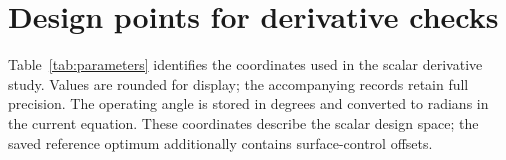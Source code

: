 \documentclass{anvil-paper}
\begin{document}
\section{Design points for derivative checks}\label{sec:parameters}
Table~\ref{tab:parameters} identifies the coordinates used in the scalar
derivative study. Values are rounded for display; the accompanying records
retain full precision. The operating angle is stored in degrees and
converted to radians in the current equation. These coordinates describe
the scalar design space; the saved reference optimum additionally contains
surface-control offsets.
\begin{table}[H]\centering\small
\caption{Initial and interior perturbed design points for the derivative
checks. Lengths refer to the unscaled geometry.}\label{tab:parameters}

\end{table}



\end{document}
